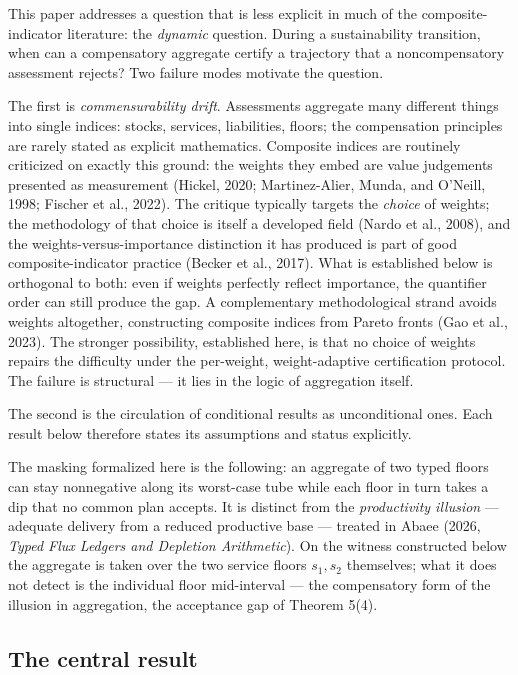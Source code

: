 \documentclass[3p,11pt]{elsarticle}
\begin{document}
This paper addresses a question that is less explicit in much of the
composite-indicator literature: the \emph{dynamic} question. During a sustainability
transition, when can a compensatory aggregate certify a trajectory that
a noncompensatory assessment rejects? Two failure modes motivate the
question.

The first is \emph{commensurability drift}. Assessments aggregate
many different things into single indices: stocks, services,
liabilities, floors; the compensation principles are rarely stated as
explicit mathematics.
Composite indices are routinely criticized on exactly this ground: the
weights they embed are value judgements presented as measurement
(Hickel, 2020; Martinez-Alier, Munda, and O'Neill, 1998; Fischer et al.,
2022). The critique
typically targets the \emph{choice} of weights; the methodology of that
choice is itself a developed field (Nardo et al., 2008), and the
weights-versus-importance distinction it has produced is part of good
composite-indicator practice (Becker et al., 2017). What is established
below is orthogonal to both: even if weights perfectly reflect importance,
the quantifier order can still produce the gap. A complementary methodological strand avoids weights altogether, constructing composite indices from Pareto fronts (Gao et al., 2023). The stronger possibility, established here, is that no choice of weights repairs the difficulty under the per-weight, weight-adaptive certification protocol. The failure is structural --- it lies in
the logic of aggregation itself.

The second is the circulation of conditional results as unconditional ones. Each result below therefore states its assumptions and status explicitly.

The masking formalized here is the following: an aggregate of two typed
floors can stay nonnegative along its worst-case tube while each floor
in turn takes a dip that no common plan accepts. It is distinct from the \emph{productivity illusion} --- adequate delivery from a reduced productive base --- treated in Abaee (2026, \emph{Typed Flux Ledgers and Depletion Arithmetic}). On the
witness constructed below the aggregate is taken over the two service
floors \(s_1, s_2\) themselves; what it does not detect is the individual floor mid-interval --- the compensatory form of the illusion in aggregation, the acceptance gap of Theorem 5(4).

\subsection{The central result}\label{the-central-result}
\end{document}
